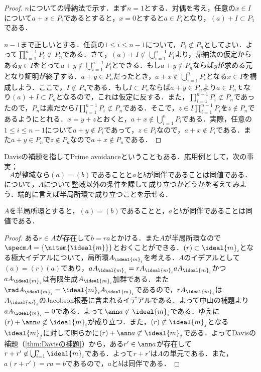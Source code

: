\begin{proof}
	$n$についての帰納法で示す．まず$n=1$とする．対偶を考え，任意の$x\in I$について$a+x\in P_i$であるとすると，$x=0$とすると$a\in P_i$となり，$(a)+I\subset P_1$である．
		
	$n-1$まで正しいとする．任意の$1\leq i\leq n-1$について，$P_i\not\subset P_n$としてよい．よって$\prod_{i=1}^{n-1}P_i\not\subset P_n$である．さて，$(a)+I\not\subset\bigcup_{i=1}^{n-1}P_i$より，帰納法の仮定からある$y\in I$をとって$a+y\not\in\bigcup_{i=1}^{n-1}P_i$とできる．もし$a+y\not\in P_n$ならば$y$が求める元となり証明が終了する．$a+y\in P_n$だったとき，$a+x\not\in \bigcup_{i=1}^n P_i$となる$x\in I$を構成しよう．ここで，$I\not\subset P_n$である．もし$I\subset P_n$ならば$a+y\in P_n$より$a\in P_n$ｔなり$(a)+I\subset P_n$となるので，これは仮定に反する．また，$\prod_{i=1}^{n-1}P_i\not\subset P_n$であったので，$P_n$は素だから$I\prod_{i=1}^{n-1}P_i\not\subset P_n$である．そこで，$z\in I\prod_{i=1}^{n-1}P_i$を$z\not\in P_n$であるようにとれる．$x=y+z$とおくと，$a+x\not\in\bigcup_{i=1}^n P_i$である．実際，任意の$1\leq i\leq n-1$について$a+y\not\in P_i$であって，$z\in P_i$なので，$a+x\not\in P_i$である．また$a+y\in P_n$で$z\not\in P_n$なので$a+x\not\in P_n$である．	
\end{proof}

Davisの補題を指してPrime avoidanceということもある．応用例として，次の事実；
\[A\text{が整域なら}(a)=(b)\text{であることと}a\text{と}b\text{が同伴であることは同値である．}\]
について，$A$について整域以外の条件を課して成り立つかどうかを考えてみよう．端的に言えば半局所環で成り立つことを示せる．

\begin{prop}\label{prop:半局所環と同伴関係}
	$A$を半局所環とすると，$(a)=(b)$であることと，$a$と$b$が同伴であることは同値である．
\end{prop}

\begin{proof}
	ある$r\in A$が存在して$b=ra$とかける．また$A$が半局所環なので$\specm A=\{\nitem{{\ideal{m}}}\}$とおくことができる．$(r)\subset{\ideal{m}}_i$となる極大イデアルについて，局所環$A_{{\ideal{m}}_i}$を考える．$A$のイデアルとして$(a)=(r)(a)$であり，$aA_{{\ideal{m}}_i}=rA_{{\ideal{m}}_i}aA_{{\ideal{m}}_i}$かつ$aA_{{\ideal{m}}_i}$は有限生成$A_{{\ideal{m}}_i}$加群である．また$\rad A_{{\ideal{m}}_i}={\ideal{m}}_iA_{{\ideal{m}}_i}$であるので，$rA_{{\ideal{m}}_i}$は$A_{{\ideal{m}}_i}$のJacobson根基に含まれるイデアルである．よって中山の補題より$aA_{{\ideal{m}}_i}=0$である．よって$\ann a\not\subset{\ideal{m}}_i$である．ゆえに$(r)+\ann a\not\subset{\ideal{m}}_i$が成り立つ．また，$(r)\not\subset{\ideal{m}}_j$となる${\ideal{m}}_j$に対して明らかに$(r)+\ann a\not\subset{\ideal{m}}_j$である．よってDavisの補題（\ref{thm:Davisの補題}）から，ある$r'\in\ann a$が存在して$r+r'\not\in\bigcup_{i=1}^n{\ideal{m}}_i$である．よって$r+r'$は$A$の単元である．また，$a(r+r')=ra=b$であるので，$a$と$b$は同伴である．
\end{proof}


